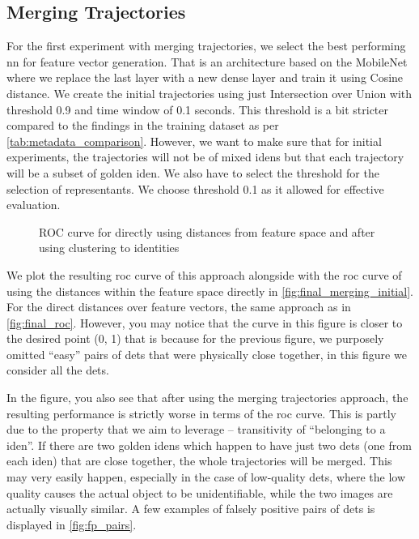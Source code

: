 \subsection{Merging Trajectories}

For the first experiment with merging trajectories, we select the best performing \gls{nn} for feature vector generation. That is an architecture based on the MobileNet where we replace the last layer with a new dense layer and train it using Cosine distance. We create the initial trajectories using just Intersection over Union with threshold 0.9 and time window of 0.1 seconds. This threshold is a bit stricter compared to the findings in the training dataset as per 
\autoref{tab:metadata_comparison}. However, we want to make sure that for initial experiments, the trajectories will not be of mixed \glspl{iden} but that each trajectory will be a subset of golden \gls{iden}. We also have to select the threshold for the selection of representants. We choose threshold 0.1 as it allowed for effective evaluation.


\begin{figure}
    \centering
    \def\svgwidth{\columnwidth}
    {}
    \caption{ROC curve for directly using distances from feature space and after using clustering to identities}
    \label{fig:final_merging_initial}
\end{figure}

We plot the resulting \gls{roc} curve of this approach alongside with the \gls{roc} curve of using the distances within the feature space directly in \autoref{fig:final_merging_initial}. For the direct distances over feature vectors, the same approach as in \autoref{fig:final_roc}. However, you may notice that the curve in this figure is closer to the desired point (0, 1) that is because for the previous figure, we purposely omitted ``easy'' pairs of \glspl{det} that were physically close together, in this figure we consider all the \glspl{det}.

In the figure, you also see that after using the merging trajectories approach, the resulting performance is strictly worse in terms of the \gls{roc} curve. This is partly due to the property that we aim to leverage -- transitivity of ``belonging to a \gls{iden}''. If there are two golden \glspl{iden} which happen to have just two \glspl{det} (one from each \gls{iden}) that are close together, the whole trajectories will be merged. This may very easily happen, especially in the case of low-quality \glspl{det}, where the low quality causes the actual object to be unidentifiable, while the two images are actually visually similar. A few examples of falsely positive pairs of \glspl{det} is displayed in \autoref{fig:fp_pairs}.

